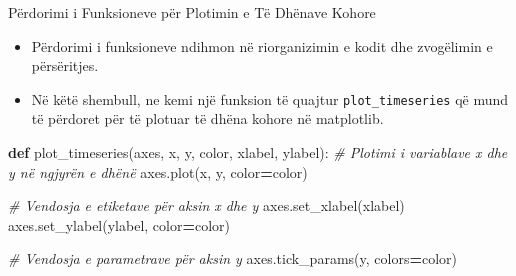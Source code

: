 \documentclass[
  ignorenonframetext,
]{beamer}
\newenvironment{Shaded}{\begin{snugshade}}{\end{snugshade}}
\newcommand{\CommentTok}[1]{\textcolor[rgb]{0.56,0.35,0.01}{\textit{#1}}}
\newcommand{\KeywordTok}[1]{\textcolor[rgb]{0.13,0.29,0.53}{\textbf{#1}}}
\newcommand{\NormalTok}[1]{#1}
\newcommand{\OperatorTok}[1]{\textcolor[rgb]{0.81,0.36,0.00}{\textbf{#1}}}
\newcommand{\StringTok}[1]{\textcolor[rgb]{0.31,0.60,0.02}{#1}}
\begin{document}
\begin{frame}[fragile]{Përdorimi i Funksioneve për Plotimin e Të Dhënave
Kohore}
\protect\hypertarget{puxebrdorimi-i-funksioneve-puxebr-plotimin-e-tuxeb-dhuxebnave-kohore}{}
\begin{itemize}
\item
  Përdorimi i funksioneve ndihmon në riorganizimin e kodit dhe
  zvogëlimin e përsëritjes.
\item
  Në këtë shembull, ne kemi një funksion të quajtur
  \texttt{plot\_timeseries} që mund të përdoret për të plotuar të dhëna
  kohore në matplotlib.
\end{itemize}


\begin{Shaded}
\begin{Highlighting}[]
\KeywordTok{def}\NormalTok{ plot\_timeseries(axes, x, y, color, xlabel, ylabel):}
    \CommentTok{\# Plotimi i variablave x dhe y në ngjyrën e dhënë}
\NormalTok{    axes.plot(x, y, color}\OperatorTok{=}\NormalTok{color)}

    \CommentTok{\# Vendosja e etiketave për aksin x dhe y}
\NormalTok{    axes.set\_xlabel(xlabel)}
\NormalTok{    axes.set\_ylabel(ylabel, color}\OperatorTok{=}\NormalTok{color)}

    \CommentTok{\# Vendosja e parametrave për aksin y}
\NormalTok{    axes.tick\_params(}\StringTok{\textquotesingle{}y\textquotesingle{}}\NormalTok{, colors}\OperatorTok{=}\NormalTok{color)}
\end{Highlighting}
\end{Shaded}
\end{frame}
\end{document}
